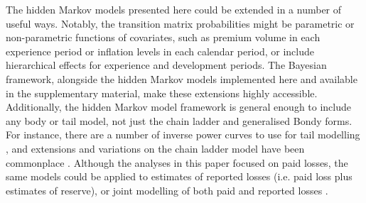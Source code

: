 The hidden Markov models presented here
could be extended in a number of useful
ways. Notably, the transition matrix
probabilities might be parametric
or non-parametric functions of covariates,
such as premium volume in each experience
period or inflation levels in each
calendar period, or include
hierarchical effects for experience
and development periods.
The Bayesian framework, alongside the
hidden Markov models implemented
here and available in the supplementary
material, make these extensions
highly accessible.
Additionally, the hidden Markov
model framework is general enough
to include any body or tail
model, not just the chain ladder
and generalised Bondy forms.
For instance, there are a
number of inverse power curves
to use for tail modelling
\citep{tailfactors2013,evans2015,clark2017},
and extensions and variations on the chain ladder
model have been commonplace \citep{englandverrall2002}.
Although the analyses in this paper focused on
paid losses, the same models could be applied
to estimates of reported losses (i.e.
paid loss plus estimates of reserve),
or joint modelling of both paid and reported
losses \citep[e.g. see][for one approach]{zhang2010}.
